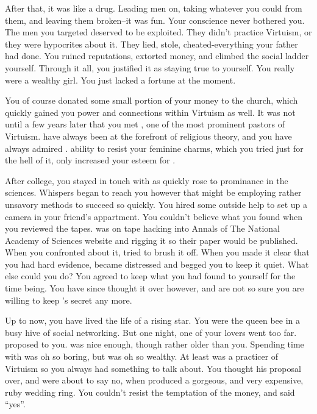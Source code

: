 \documentclass[char]{guildcamp1}
\begin{document}
After that, it was like a drug. Leading men on, taking whatever you could from them, and leaving them broken--it was fun. Your conscience never bothered you. The men you targeted deserved to be exploited. They didn't practice Virtuism, or they were hypocrites about it. They lied, stole, cheated-everything your father had done. You ruined reputations, extorted money, and climbed the social ladder yourself. Through it all, you justified it as staying true to yourself. You really were a wealthy girl. You just lacked a fortune at the moment.  

You of course donated some small portion of your money to the church, which quickly gained you power and connections within Virtuism as well. It was not until a few years later that you met \cPastor{}, one of the most prominent pastors of Virtuism.  have always been at the forefront of religious theory, and you have always admired .  ability to resist your feminine charms, which you tried just for the hell of it, only increased your esteem for \cPastor. 

After college, you stayed in touch with \cRival{} as  quickly rose to prominance in the sciences. Whispers began to reach you however that \cRival{} might be employing rather unsavory methods to succeed so quickly. You hired some outside help to set up a camera in your friend's appartment. You couldn't believe what you found when you reviewed the tapes. \cRival{} was on tape hacking into Annals of The National Academy of Sciences website and rigging it so their paper would be published. When you confronted  about it,  tried to brush it off. When you made it clear that you had hard evidence, \cRival{} became distressed and begged you to keep it quiet.  What else could you do? You agreed to keep what you had found to yourself for the time being. You have since thought it over however, and are not so sure you are willing to keep \cRival{}'s secret any more.

Up to now, you have lived the life of a rising star. You were the queen bee in a busy hive of social networking. But one night, one of your lovers went too far. \cGroom{} proposed to you.  was nice enough, though rather older than you. Spending time with  was oh so boring, but  was oh so wealthy. At least  was  a practicer of Virtuism so you always had something to talk about. You thought his proposal over, and were about to say no, when  produced a gorgeous, and very expensive, ruby wedding ring. You couldn't resist the temptation of the money, and said ``yes''.
\end{document}
